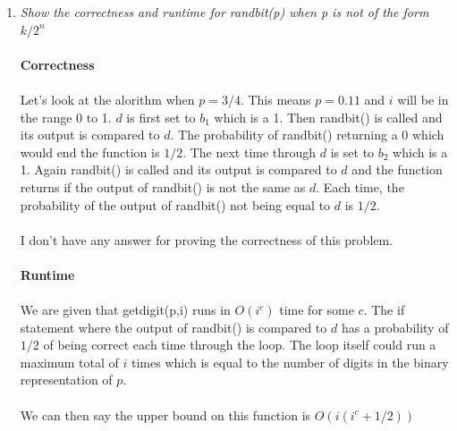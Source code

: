 \documentclass[12pt]{article}
\begin{document}
\begin{enumerate}
\begin{enumerate}
			\item \textit{Show the correctness and runtime for randbit(p) when p is not of the form $k/2^n$}\\
			\\
			\textbf{Correctness}\\
			\\
			Let's look at the alorithm when $p = 3/4$.
			This means $p = 0.11$ and $i$ will be in the range 0 to 1.
			$d$ is first set to $b_1$ which is a 1.  Then randbit() is called and its output is compared to $d$.
			The probability of randbit() returning a 0 which would end the function is $1/2$.  
			The next time through $d$ is set to $b_2$ which is a 1.  
			Again randbit() is called and its output is compared to $d$ and the function returns if 
			the output of randbit() is not the same as $d$.
			Each time, the probability of the output of randbit() not being equal to $d$ is $1/2$.\\  
			\\ 
			I don't have any answer for proving the correctness of this problem.\\
			\\
			\textbf{Runtime}\\
			\\	
			We are given that getdigit(p,i) runs in $O(i^c)$ time for some $c$.  
			The if statement where the output of randbit() is compared to $d$ has a probability of $1/2$ of being correct
			each time through the loop.  The loop itself could run a maximum total of $i$ times 
			which is equal to the number of digits in the binary representation of $p$.\\
			\\
			We can then say the upper bound on this function is $O(i (i^c + 1/2))$
		\end{enumerate}


\end{enumerate}
\end{document}
